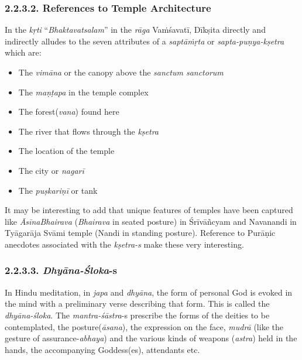 \subsubsection*{2.2.3.2. References to Temple Architecture}

In the \textit{kṛti} “\textit{Bhaktavatsalam}” in the \textit{rāga} Vaṁśavatī, Dīkṣita directly and indirectly alludes to the seven attributes of a \textit{saptāṁṛta} or \textit{sapta-puṇya-kṣetra} which are:

\begin{itemize}
\itemsep=0pt
\item The \textit{vimāna} or the canopy above the \textit{sanctum sanctorum}

 \item The \textit{maṇṭapa} in the temple complex

 \item The forest(\textit{vana}) found here

 \item The river that flows through the \textit{kṣetra}

 \item The location of the temple

 \item The city or \textit{nagarī}

 \item The \textit{puṣkariṇī} or tank

\end{itemize}

It may be interesting to add that unique features of temples have been captured like \textit{ĀsīnaBhairava} (\textit{Bhairava} in seated posture) in Śrīvāñcyam and Navanandi in Tyāgarāja Svāmi temple (Nandi in standing posture). Reference to Purāṇic anecdotes associated with the \textit{kṣetra-s} make these very interesting.


\subsubsection*{2.2.3.3. \textit{Dhyāna-Śloka}-s}

In Hindu meditation, in \textit{japa} and \textit{dhyāna}, the form of personal God is evoked in the mind with a preliminary verse describing that form. This is called the \textit{dhyāna-śloka}. The \textit{mantra-śāstra}-s prescribe the forms of the deities to be contemplated, the posture(\textit{āsana}), the expression on the face, \textit{mudrā} (like the gesture of assurance-\textit{abhaya}) and the various kinds of weapons (\textit{astra}) held in the hands, the accompanying Goddess(es), attendants etc.

